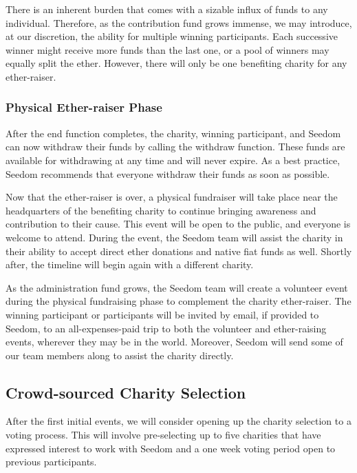 \documentclass[11pt]{article}
\begin{document}
There is an inherent burden that comes with a sizable influx of funds to any individual. Therefore, as the contribution fund grows immense, we may introduce, at our discretion, the ability for multiple winning participants. Each successive winner might receive more funds than the last one, or a pool of winners may equally split the ether. However, there will only be one benefiting charity for any ether-raiser.

\subsubsection{Physical Ether-raiser Phase}

After the end function completes, the charity, winning participant, and Seedom can now withdraw their funds by calling the withdraw function. These funds are available for withdrawing at any time and will never expire. As a best practice, Seedom recommends that everyone withdraw their funds as soon as possible.

Now that the ether-raiser is over, a physical fundraiser will take place near the headquarters of the benefiting charity to continue bringing awareness and contribution to their cause. This event will be open to the public, and everyone is welcome to attend. During the event, the Seedom team will assist the charity in their ability to accept direct ether donations and native fiat funds as well. Shortly after, the timeline will begin again with a different charity.

As the administration fund grows, the Seedom team will create a volunteer event during the physical fundraising phase to complement the charity ether-raiser. The winning participant or participants will be invited by email, if provided to Seedom, to an all-expenses-paid trip to both the volunteer and ether-raising events, wherever they may be in the world. Moreover, Seedom will send some of our team members along to assist the charity directly.

\subsection{Crowd-sourced Charity Selection}

After the first initial events, we will consider opening up the charity selection to a voting process. This will involve pre-selecting up to five charities that have expressed interest to work with Seedom and a one week voting period open to previous participants.
\end{document}
